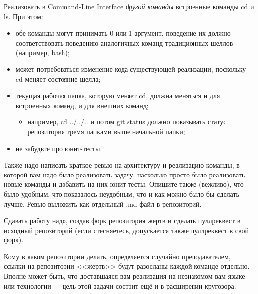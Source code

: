 \documentclass[a5paper]{homework}
\begin{document}

Реализовать в Command-Line Interface \emph{другой команды} встроенные команды cd и ls. При этом:

\begin{itemize}
    \item обе команды могут принимать 0 или 1 аргумент, поведение их должно соответствовать поведению аналогичных команд традиционных шеллов (например, bash);
    \item может потребоваться изменение кода существующей реализации, поскольку cd меняет состояние шелла;
    \item текущая рабочая папка, которую меняет cd, должна меняться и для встроенных команд, и для внешних команд;
    \begin{itemize}
        \item например, cd ../../.. и потом git status должно показывать статус репозитория тремя папками выше начальной папки;
    \end{itemize}
    \item не забудьте про юнит-тесты.
\end{itemize}

Также надо написать краткое ревью на архитектуру и реализацию команды, в которой вам надо было реализовать задачу: насколько просто было реализовать новые команды и добавить на них юнит-тесты. Опишите также (вежливо), что было удобным, что показалось неудобным, что и как можно было бы сделать лучше. Ревью выложить как отдельный .md-файл в репозиторий.

Сдавать работу надо, создав форк репозитория жертв и сделать пуллреквест в исходный репозиторий (если стесняетесь, допускается также пуллреквест в свой форк).

Кому в каком репозитории делать, определяется случайно преподавателем, ссылки на репозитории <<жертв>> будут разосланы каждой команде отдельно. Вполне может быть, что доставшаяся вам реализация на незнакомом вам языке или технологии --- цель этой задачи состоит ещё и в расширении кругозора.
\end{document}
